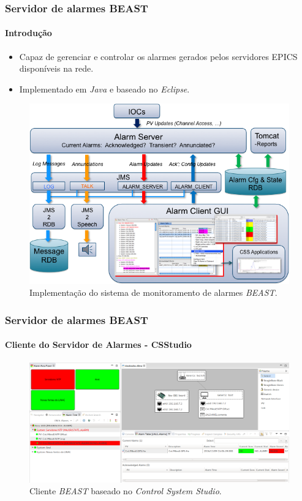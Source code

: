 \documentclass{beamer}
\begin{document}
\begin{frame}
\frametitle{Servidor de alarmes BEAST}
\framesubtitle{Introdução}
\begin{itemize}
  \item Capaz de gerenciar e controlar os alarmes gerados pelos servidores
  EPICS disponíveis na rede.
  \item Implementado em \textit{Java} e baseado no \textit{Eclipse}.
\end{itemize}

\begin{figure}[h]

\centering
\includegraphics[scale=0.25]{image/beast-arquitetura}
\caption {Implementação do sistema de monitoramento de alarmes
\textit{BEAST}.}
\label{fig:best_arquitetura}
\end{figure}

\end{frame}


\begin{frame}
\frametitle{Servidor de alarmes BEAST}
\framesubtitle{Cliente do Servidor de Alarmes - CSStudio}
\begin{figure}[h]
\centering
\includegraphics[width=\textwidth]{image/beast-screen-shot}
\caption {Cliente \textit{BEAST} baseado no \textit{Control System Studio}.}
\label{fig:alarm}
\end{figure}

\end{frame}
\end{document}

